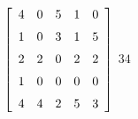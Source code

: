 {$\left[ \begin {array}{ccccc} 4&0&5&1&0\\\noalign{\medskip}1&0&3&1&5
\\\noalign{\medskip}2&2&0&2&2\\\noalign{\medskip}1&0&0&0&0
\\\noalign{\medskip}4&4&2&5&3\end {array} \right]$} 
{$34$}



  


